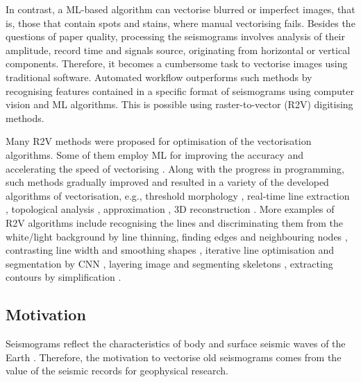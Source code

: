 \documentclass[a4paper,english,12pt]{article}
\begin{document}
In contrast, a ML-based algorithm can vectorise blurred or imperfect images, that is, those that contain spots and stains, where manual vectorising fails. Besides the questions of paper quality, processing the seismograms involves analysis of their amplitude, record time and signals source, originating from horizontal or vertical components. Therefore, it becomes a cumbersome task to vectorise images using traditional software. Automated workflow outperforms such methods by recognising features contained in a specific format of seismograms using computer vision and ML algorithms. This is possible using raster-to-vector (R2V) digitising methods.

Many R2V methods were proposed for optimisation of the vectorisation algorithms. Some of them employ ML for improving the accuracy and accelerating the speed of vectorising \cite{SilvaCoira,Mineter,Tafoya,Doucette}. Along with the progress in programming, such methods gradually improved and resulted in a variety of the developed algorithms of vectorisation, e.g., threshold morphology \cite{Janssen1997}, real-time line extraction \cite{Pferd,FULFORD198165}, topological analysis \cite{GROSS1995370}, approximation \cite{StanberryBesag,WallDanielsson}, 3D reconstruction \cite{Ceylan}. More examples of R2V algorithms include recognising the lines and discriminating them from the white/light background by line thinning, finding edges and neighbouring nodes \cite{Suzuki}, contrasting line width and smoothing shapes \cite{BaoFu}, iterative line optimisation and segmentation by CNN \cite{Inoue}, layering image and segmenting skeletons \cite{Hilaire}, extracting contours by simplification \cite{San,Chenetal2006}. 

\subsection{Motivation}
Seismograms reflect the characteristics of body and surface seismic waves of the Earth \cite{Kawai,Kennett}. Therefore, the motivation to vectorise old seismograms comes from the value of the seismic records for geophysical research. 
 
\end{document}
